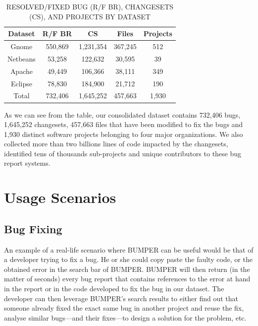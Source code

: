 \documentclass[conference]{IEEEtran}
\begin{document}
\begin{table}[]
\centering
\caption{
RESOLVED/FIXED BUG (R/F BR),  CHANGESETS (CS), AND
PROJECTS BY DATASET}
\label{tab:summary}
\begin{tabular}{c|c|c|c|c}
\textbf{Dataset} & \textbf{R/F BR} & \textbf{CS} & \textbf{Files} & \textbf{Projects} \\ \hline \hline
Gnome            & 550,869         & 1,231,354   & 367,245        & 512                \\ \hline
Netbeans         & 53,258          & 122,632     & 30,595         & 39                \\ \hline
Apache           & 49,449          & 106,366     & 38,111         & 349               \\ \hline
Eclipse          & 78,830          & 184,900     & 21,712         & 190                \\ \hline \hline
Total            & 732,406         & 1,645,252   & 457,663        & 1,930               \\ \hline \hline
\end{tabular}
\end{table}

As we can see from the table, our consolidated dataset contains 732,406 bugs, 1,645,252 changesets, 457,663 files that have been modified to fix the bugs and 1,930 distinct software projects belonging to four major organizations.
We also collected more than two billions lines of code impacted by the changesets, identified tens of thousands sub-projects and unique contributors to these bug report systems.


\section{Usage Scenarios}

\subsection{Bug Fixing}
\label{subs:Bug Fixing}


An example of a real-life scenario where BUMPER can be useful would be that of a developer trying to fix a bug. He or she could copy paste the faulty code, or the obtained error in the search bar of BUMPER. BUMPER will then return (in the matter of seconds) every bug report that contains references to the error at hand in the report or in the code developed to fix the bug in our dataset. The developer can then leverage BUMPER’s search results to either find out that someone already fixed the exact same bug in another project and reuse the fix, analyse similar bugs—and their fixes—to design a solution for the problem, etc.
\end{document}
